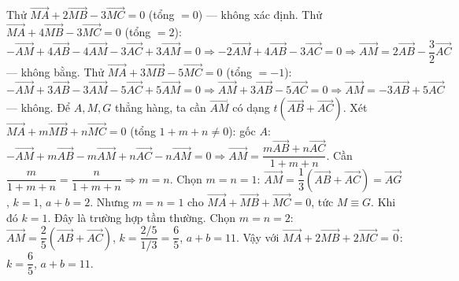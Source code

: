 \begin{bt}
{Thử $\overrightarrow{MA}+2\overrightarrow{MB}-3\overrightarrow{MC}=0$ (tổng $=0$) — không xác định.
Thử $\overrightarrow{MA}+4\overrightarrow{MB}-3\overrightarrow{MC}=0$ (tổng $=2$): $-\overrightarrow{AM}+4\overrightarrow{AB}-4\overrightarrow{AM}-3\overrightarrow{AC}+3\overrightarrow{AM}=0\Rightarrow-2\overrightarrow{AM}+4\overrightarrow{AB}-3\overrightarrow{AC}=0\Rightarrow\overrightarrow{AM}=2\overrightarrow{AB}-\dfrac32\overrightarrow{AC}$ — không bằng.
Thử $\overrightarrow{MA}+3\overrightarrow{MB}-5\overrightarrow{MC}=0$ (tổng $=-1$): $-\overrightarrow{AM}+3\overrightarrow{AB}-3\overrightarrow{AM}-5\overrightarrow{AC}+5\overrightarrow{AM}=0\Rightarrow\overrightarrow{AM}+3\overrightarrow{AB}-5\overrightarrow{AC}=0\Rightarrow\overrightarrow{AM}=-3\overrightarrow{AB}+5\overrightarrow{AC}$ — không.
Để $A,M,G$ thẳng hàng, ta cần $\overrightarrow{AM}$ có dạng $t(\overrightarrow{AB}+\overrightarrow{AC})$. Xét $\overrightarrow{MA}+m\overrightarrow{MB}+n\overrightarrow{MC}=0$ (tổng $1+m+n\neq0$): gốc $A$: $-\overrightarrow{AM}+m\overrightarrow{AB}-m\overrightarrow{AM}+n\overrightarrow{AC}-n\overrightarrow{AM}=0\Rightarrow\overrightarrow{AM}=\dfrac{m\overrightarrow{AB}+n\overrightarrow{AC}}{1+m+n}$.
Cần $\dfrac{m}{1+m+n}=\dfrac{n}{1+m+n}\Rightarrow m=n$. Chọn $m=n=1$: $\overrightarrow{AM}=\dfrac13(\overrightarrow{AB}+\overrightarrow{AC})=\overrightarrow{AG}$, $k=1$, $a+b=2$.
Nhưng $m=n=1$ cho $\overrightarrow{MA}+\overrightarrow{MB}+\overrightarrow{MC}=0$, tức $M\equiv G$. Khi đó $k=1$. Đây là trường hợp tầm thường.
Chọn $m=n=2$: $\overrightarrow{AM}=\dfrac{2}{5}(\overrightarrow{AB}+\overrightarrow{AC})$, $k=\dfrac{2/5}{1/3}=\dfrac65$, $a+b=11$.
Vậy với $\overrightarrow{MA}+2\overrightarrow{MB}+2\overrightarrow{MC}=\overrightarrow{0}$: $k=\dfrac65$, $a+b=11$.
}

\end{bt}

